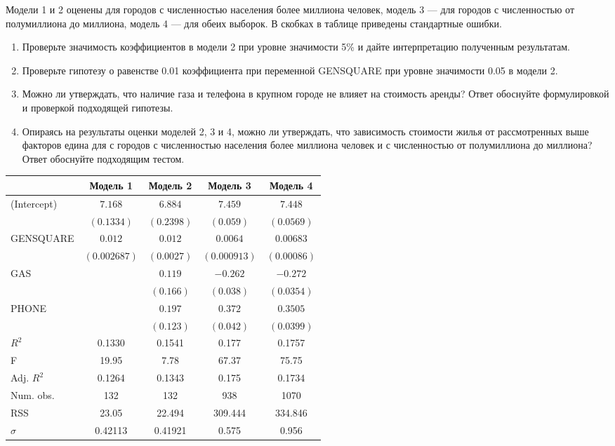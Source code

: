 \begin{enumerate}
Модели 1 и 2 оценены для городов с численностью населения более миллиона человек, модель 3 — для городов с численностью от полумиллиона до миллиона, модель 4 — для обеих выборок. В скобках в таблице приведены стандартные ошибки.

\begin{enumerate}
\item Проверьте значимость коэффициентов в модели 2 при уровне значимости 5\% и дайте интерпретацию полученным результатам.
\item Проверьте гипотезу о равенстве 0.01 коэффициента при переменной GENSQUARE при уровне значимости 0.05 в модели 2.
\item Можно ли утверждать, что наличие газа и телефона в крупном городе не влияет на стоимость аренды? Ответ обоснуйте  формулировкой и проверкой подходящей гипотезы.
\item Опираясь на результаты оценки моделей 2, 3 и 4, можно ли утверждать, что зависимость стоимости жилья от рассмотренных выше факторов едина для с городов с численностью населения более миллиона человек и с численностью от полумиллиона до миллиона? Ответ обоснуйте подходящим тестом.
\end{enumerate}

\begin{tabular}{l c c c c }
\toprule
 & Модель 1 & Модель 2 & Модель 3 & Модель 4 \\
\midrule
(Intercept) & $7.168$      & $6.884$    & $7.459$      & $7.448$    \\
            & $(0.1334)$   & $(0.2398)$ & $(0.059)$   & $(0.0569)$ \\
GENSQUARE   &  $0.012$     & $0.012$    & $0.0064$     & $0.00683$   \\
            & $(0.002687)$ & $(0.0027)$ & $(0.000913)$ & $(0.00086)$ \\
GAS         &              & $0.119$    & $-0.262$      & $-0.272$    \\
            &              & $(0.166)$  & $(0.038)$    & $(0.0354)$  \\
PHONE       &              & $0.197$    & $0.372$      & $0.3505$    \\
            &              & $(0.123)$  & $(0.042)$   & $(0.0399)$  \\
\midrule
$R^2$        & 0.1330         & 0.1541      & 0.177         & 0.1757     \\
F            & 19.95          & 7.78        & 67.37          & 75.75     \\
Adj. $R^2$   & 0.1264         & 0.1343      & 0.175         & 0.1734    \\
Num. obs.    & 132            & 132         & 938           & 1070       \\
RSS          & 23.05          & 22.494      & 309.444       & 334.846    \\
$\hat\sigma$ & 0.42113        & 0.41921     & 0.575        & 0.956    \\
\bottomrule
\end{tabular}


\end{enumerate}


